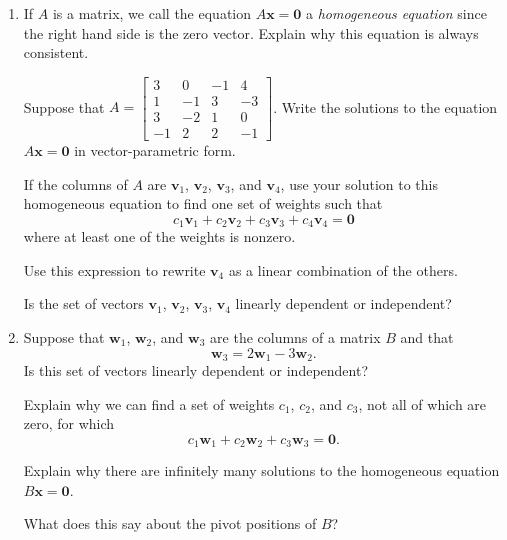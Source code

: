 \documentclass[12pt]{article}
\newcommand{\vs}[1]{\vspace{#1in}}
\newcommand{\vvec}{{\mathbf v}}
\newcommand{\wvec}{{\mathbf w}}
\newcommand{\xvec}{{\mathbf x}}
\newcommand{\zerovec}{{\mathbf 0}}
\newcommand{\real}{{\mathbb R}}
\begin{document}
\begin{enumerate}
  \vs{1.5}
  
  Explain why seven vectors in $\real^5$ cannot be linearly
  independent.

  \vs{1.25}
  What is the largest number of vectors in $\real^5$ that can be
  linearly independent?

  \vs{1.25}
  If you have three vectors in $\real^5$, can you guarantee that they
  are linearly independent?

  \vs{1}
\item If $A$ is a matrix, we call the equation $A\xvec=\zerovec$ a
  {\em homogeneous equation} since the right hand side is the zero
  vector.  Explain why this equation is always consistent.

  \vs{1}
  \newpage
  Suppose that 
  $
  A = 
  \begin{bmatrix}
    3 & 0 & -1 & 4 \\
    1 & -1 & 3 & -3 \\
    3 & -2 & 1 & 0 \\
    -1 & 2 & 2 & -1
  \end{bmatrix}
  $.  Write the solutions to the equation $A\xvec=\zerovec$ in
  vector-parametric form.

  \vs{2}
  If the columns of $A$ are $\vvec_1$, $\vvec_2$, $\vvec_3$, and
  $\vvec_4$, use your solution to this homogeneous equation to find
  one set of weights such that
  $$
  c_1\vvec_1+c_2\vvec_2+c_3\vvec_3+c_4\vvec_4 = \zerovec
  $$
  where at least one of the weights is nonzero.

  \vs{1.25}
  Use this expression to rewrite $\vvec_4$ as a linear combination of
  the others.

  \vs{1.25}
  Is the set of vectors $\vvec_1$, $\vvec_2$, $\vvec_3$, $\vvec_4$
  linearly dependent or independent?

  \vs{1.25}
  \newpage
\item Suppose that $\wvec_1$, $\wvec_2$, and $\wvec_3$ are the columns
  of a matrix $B$ and that
  $$
  \wvec_3 = 2\wvec_1 - 3\wvec_2.
  $$
  Is this set of vectors linearly dependent or independent?

  \vs{1}
  Explain why we can find a set of weights $c_1$, $c_2$, and $c_3$,
  not all of which are zero, for which
  $$
  c_1\wvec_1+c_2\wvec_2 + c_3\wvec_3 = \zerovec.
  $$

  \vs{1}
  Explain why there are infinitely many solutions to the homogeneous
  equation $B\xvec=\zerovec$.

  \vs{1}
  What does this say about the pivot positions of $B$?


\end{enumerate}
\end{document}
